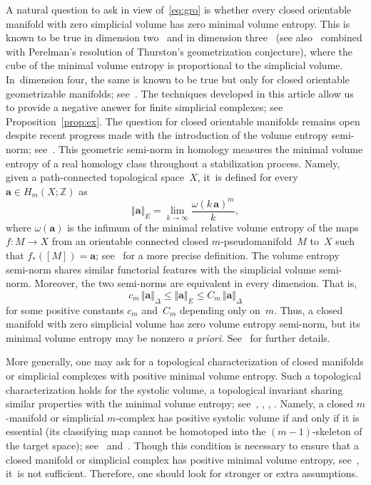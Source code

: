 \documentclass[JEP,XML,SOM,Unicode,NoFloatCountersInSection,published]{cedram}
\newcommand{\bma}{{\boldsymbol{a}}}
\theoremstyle{definition}
\newcommand\Z{{\mathbb Z}}
\begin{document}
A natural question to ask in view of~\eqref{eq:gro} is whether every closed orientable manifold with zero simplicial volume has zero minimal volume entropy.
This is known to be true in dimension two~\cite{katok} and in dimension three~\cite{pieroni} (see also~\cite{AP03} combined with Perelman's resolution of Thurston's geometrization conjecture), where the cube of the minimal volume entropy is proportional to the simplicial volume. In~dimension four, the same is known to be true but only for closed orientable geometrizable manifolds; see~\cite{SS09}.
The techniques developed in this article allow us to provide a negative answer for finite simplicial complexes; see Proposition~\ref{prop:ex}.
The question for closed orientable manifolds remains open despite recent progress made with the introduction of the volume entropy semi-norm; see~\cite{BS}.
This geometric semi-norm in homology measures the minimal volume entropy of a real homology class throughout a stabilization process.
Namely, given a path-connected topological space~$X$, it~is defined for every $\bma \in H_m(X;\Z)$ as
\begin{equation*}%
\Vert \bma \Vert_E = \lim_{k \to \infty} \frac{\omega(k \, \bma)^m}{k},
\end{equation*}
where $\omega(\bma)$ is the infimum of the minimal relative volume entropy of the maps \hbox{$f:M \to X$} from an orientable connected closed $m$\nobreakdash-pseudomanifold~$M$ to~$X$ such that $f_*([M])=\bma$; see~\cite{BS} for a more precise definition.
The volume entropy semi-norm shares similar functorial features with the simplicial volume semi-norm.
Moreover, the two semi-norms are equivalent in every dimension.
That is,
\begin{equation} \label{eq:BS}
c_m \, \Vert \bma \Vert_\Delta \leq \Vert \bma \Vert_E \leq C_m \, \Vert \bma \Vert_\Delta
\end{equation}
for some positive constants $c_m$ and~$C_m$ depending only on~$m$.
Thus, a closed manifold with zero simplicial volume has zero volume entropy semi-norm, but its minimal volume entropy may be nonzero \emph{a priori}.
See~\cite{BS} for further details.

More generally, one may ask for a topological characterization of closed manifolds or simplicial complexes with positive minimal volume entropy.
Such a topological characterization holds for the systolic volume, a topological invariant sharing similar properties with the minimal volume entropy; see~\cite{B93}, \cite{B06}, \cite{B08}, \cite{Brunnbauer08}.
Namely, a closed $m$\nobreakdash-manifold or simplicial $m$\nobreakdash-complex has positive systolic volume if and only if it is essential (\ie its classifying map cannot be homotoped into the $(m-1)$-skeleton of the target space); see~\cite{gro83} and~\cite{B93}.
Though this condition is necessary to ensure that a closed manifold or simplicial complex has positive minimal volume entropy, see~\cite{B93}, it~is not sufficient.
Therefore, one should look for stronger or extra assumptions.
\end{document}
